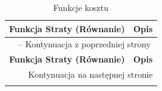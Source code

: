 \begin{longtable}{p{}p{}}
    \caption{Funkcje kosztu}
    \label{tab:loss_functions} \\
    \toprule
    \textbf{Funkcja Straty (Równanie)} & \textbf{Opis} \\
    \midrule
    \endfirsthead
    
    \multicolumn{2}{c}{{\tablename\ \thetable{} -- Kontynuacja z poprzedniej strony}} \\
    \toprule
    \textbf{Funkcja Straty (Równanie)} & \textbf{Opis} \\
    \midrule
    \endhead
    
    \midrule
    \multicolumn{2}{r}{{Kontynuacja na następnej stronie}} \\
    \endfoot
    
    \bottomrule
    \endlastfoot
    

\end{longtable}
